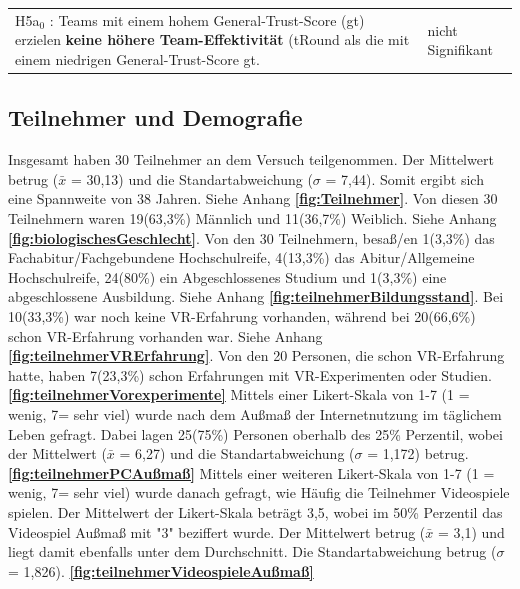 \documentclass[a4paper,11pt]{article}%
\renewcommand{\\}{\vspace*{0.5\baselineskip} \newline}
\begin{document}
\begin{table}[H]
\begin{tabularx}{\textwidth}{p{12cm} | p{3.5cm}}
		\hline 	\\
		
		H5a$_{0}$ : Teams mit einem hohem General-Trust-Score (\ac{gt}) erzielen \textbf{keine höhere Team-Effektivität} (\ac{tRound} als die mit einem niedrigen General-Trust-Score \ac{gt}.\\		
		& nicht Signifikant \\
		
		\hline 	\\
	\end{tabularx}
\end{table}		

\newpage

	\subsection{Teilnehmer und Demografie}
Insgesamt haben 30 Teilnehmer an dem Versuch teilgenommen. Der Mittelwert betrug ($\bar{x}$ = 30,13) und die Standartabweichung ($\sigma$ = 7,44). Somit ergibt sich eine Spannweite von 38 Jahren. Siehe Anhang \textbf{\autoref{fig:Teilnehmer}}.\\
Von diesen 30 Teilnehmern waren 19(63,3\%) Männlich und 11(36,7\%) Weiblich. Siehe Anhang \textbf{\autoref{fig:biologischesGeschlecht}}.\\
Von den 30 Teilnehmern, besaß/en 1(3,3\%) das Fachabitur/Fachgebundene Hochschulreife, 4(13,3\%) das Abitur/Allgemeine Hochschulreife, 24(80\%) ein Abgeschlossenes Studium und 1(3,3\%) eine abgeschlossene Ausbildung. Siehe Anhang \textbf{\autoref{fig:teilnehmerBildungsstand}}.\\
Bei 10(33,3\%) war noch keine VR-Erfahrung vorhanden, während bei 20(66,6\%) schon VR-Erfahrung vorhanden war. Siehe Anhang \textbf{\autoref{fig:teilnehmerVRErfahrung}}.\\ 
Von den 20 Personen, die schon VR-Erfahrung hatte, haben 7(23,3\%) schon Erfahrungen mit VR-Experimenten oder Studien. \textbf{\autoref{fig:teilnehmerVorexperimente}} \\
Mittels einer Likert-Skala von 1-7 (1 = wenig, 7= sehr viel) wurde nach dem Außmaß der Internetnutzung im täglichem Leben gefragt. Dabei lagen 25(75\%) Personen oberhalb des 25\% Perzentil, wobei der Mittelwert ($\bar{x}$ = 6,27) und die Standartabweichung ($\sigma$ = 1,172) betrug. \textbf{\autoref{fig:teilnehmerPCAußmaß}} \\ 
Mittels einer weiteren Likert-Skala von 1-7 (1 = wenig, 7= sehr viel) wurde danach gefragt, wie Häufig die Teilnehmer Videospiele spielen. Der Mittelwert der Likert-Skala beträgt 3,5, wobei im 50\% Perzentil das Videospiel Außmaß mit "3" beziffert wurde. Der Mittelwert betrug ($\bar{x}$ = 3,1) und liegt damit ebenfalls unter dem Durchschnitt. Die Standartabweichung betrug ($\sigma$ = 1,826). \textbf{\autoref{fig:teilnehmerVideospieleAußmaß}}
\end{document}
